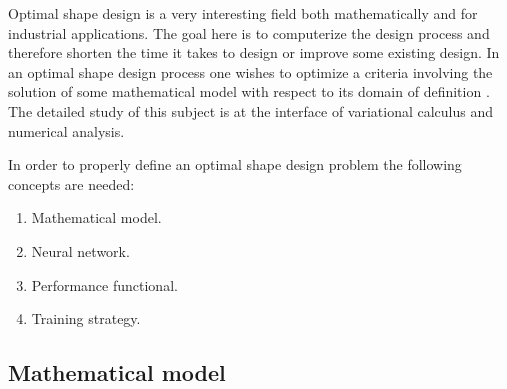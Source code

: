 Optimal shape design is a very interesting field both mathematically
and for industrial applications. The goal here is to computerize the
design process and therefore shorten the time it takes to design or
improve some existing design. In an optimal shape design process one
wishes to optimize a criteria involving the solution of some
mathematical model with respect to its domain of definition
\cite{Mohammadi2004}. The detailed study of this subject is at the
interface of variational calculus and numerical analysis.

%



In order to properly define an optimal shape design problem the
following concepts are needed:

\begin{enumerate}
\item Mathematical model.
\item Neural network.
\item Performance functional. 
\item Training strategy.
\end{enumerate}

\subsection*{Mathematical model}

